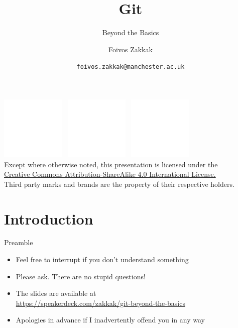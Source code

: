 \documentclass[
14pt,
aspectratio=169,
usenames,
dvipsnames,
x11names]{beamer}
\title[Git: Beyond the Basics]{Git}
\subtitle{Beyond the Basics}
\author[\texttt{foivos.zakkak@manchester.ac.uk}]{Foivos Zakkak}
\date{\texttt{foivos.zakkak@manchester.ac.uk}}
\begin{document}


\begin{frame}[plain]
  \titlepage
  \centering
  \includegraphics[height=.75cm]{../creative-commons/cc}~
  \includegraphics[height=.75cm]{../creative-commons/by}~
  \includegraphics[height=.75cm]{../creative-commons/sa}\\[1em]
  \scriptsize{Except where otherwise noted, this presentation is licensed under the\\
    \href{http://creativecommons.org/licenses/by-nc-sa/4.0/}%
    {Creative Commons Attribution-ShareAlike 4.0 International License.}\\[1ex]
    Third party marks and brands are the property of their respective
    holders.}
\end{frame}


\section{Introduction}

\begin{frame}{Preamble}
  \begin{itemize} \setlength{\itemsep}{\fill}
  \item Feel free to \alert{interrupt} if you don't understand something
  \item Please ask. \alert{There are no stupid questions}!
  \item The slides are available at\\ {\small\url{https://speakerdeck.com/zakkak/git-beyond-the-basics}}
  \item %
    Apologies in advance if I \alert{inadvertently} offend you in any way
  \end{itemize}
\end{frame}
\end{document}
